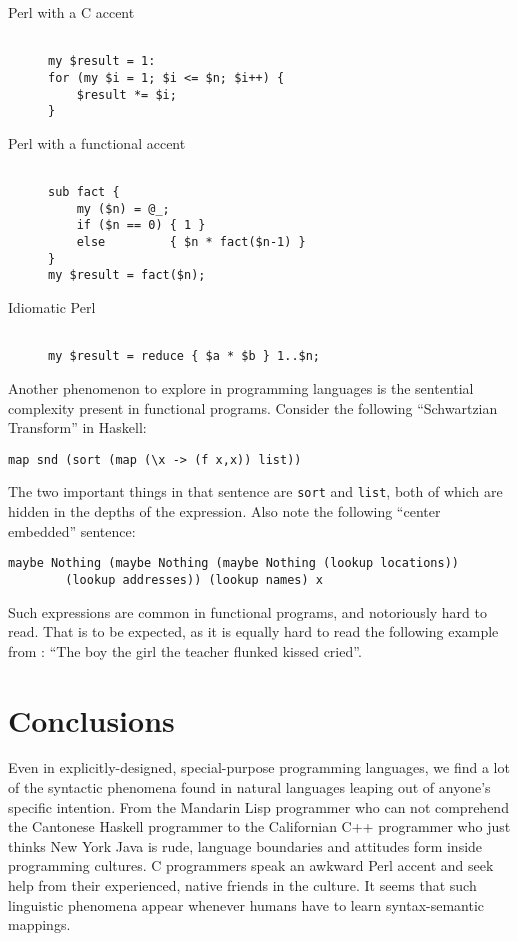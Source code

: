 \documentclass[12pt]{article}
\begin{document}
\begin{description}
\item[Perl with a C accent]
\begin{verbatim}

my $result = 1:
for (my $i = 1; $i <= $n; $i++) {
    $result *= $i;
}
\end{verbatim}

\item[Perl with a functional accent] 
\begin{verbatim}

sub fact {
    my ($n) = @_;
    if ($n == 0) { 1 }
    else         { $n * fact($n-1) }
}
my $result = fact($n);
\end{verbatim}

\item[Idiomatic Perl]
\begin{verbatim}

my $result = reduce { $a * $b } 1..$n;
\end{verbatim}
\end{description}

Another phenomenon to explore in programming languages is the sentential
complexity present in functional programs.  Consider the following
``Schwartzian Transform'' in Haskell:

\begin{verbatim}
map snd (sort (map (\x -> (f x,x)) list))
\end{verbatim}

The two important things in that sentence are \texttt{sort} and
\texttt{list}, both of which are hidden in the depths of the
expression.  Also note the following ``center embedded''
sentence:

\begin{verbatim}
maybe Nothing (maybe Nothing (maybe Nothing (lookup locations)) 
        (lookup addresses)) (lookup names) x
\end{verbatim}

Such expressions are common in functional programs, and notoriously hard
to read.  That is to be expected, as it is equally hard to read the
following example from \cite{Abe-Hatasa-Cowan-1988}: ``The boy the girl
the teacher flunked kissed cried''.

\section{Conclusions}

Even in explicitly-designed, special-purpose programming languages, we
find a lot of the syntactic phenomena found in natural languages leaping
out of anyone's specific intention.  From the Mandarin Lisp programmer
who can not comprehend the Cantonese Haskell programmer to the
Californian C++ programmer who just thinks New York Java is rude,
language boundaries and attitudes form inside programming cultures.  C
programmers speak an awkward Perl accent and seek help from their
experienced, native friends in the culture.  It seems that such
linguistic phenomena appear whenever humans have to learn
syntax-semantic mappings.
\end{document}
